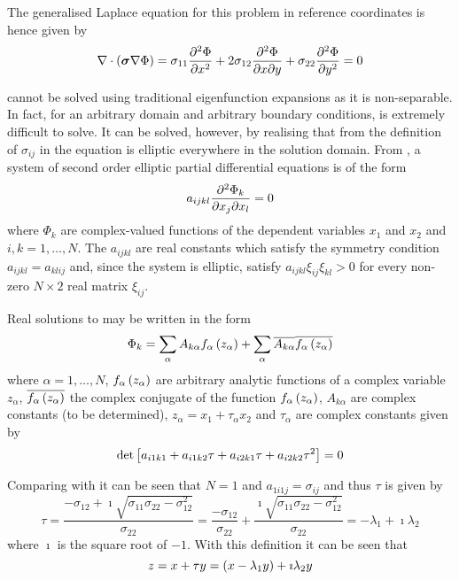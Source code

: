 The generalised Laplace equation for this problem in reference coordinates is
hence given by
\begin{equation}
  \divergence{}{\pbrac{\tensor{\sigma}\gradient{}\Phi}}=\sigma_{11}\deltwosqby{\Phi}
  {x}+2\sigma_{12}\deltwoby{\Phi}{x}{y}+\sigma_{22}\deltwosqby{\Phi}{y}
  =0
  \label{eqn:2DrcgenLaplace}
\end{equation}

 cannot be solved using traditional eigenfunction
expansions as it is non-separable. In fact, for an arbitrary domain and
arbitrary boundary conditions,  is extremely
difficult to solve. It can be solved, however, by realising that from the
definition of $\sigma_{ij}$ in  the
equation is elliptic everywhere in the solution domain. From
\citet{clements:1981}, a system of second order elliptic partial
differential equations is of the form
\begin{equation}
  a_{ijkl}\deltwoby{\Phi_{k}}{x_{j}}{x_{l}}=0
  \label{eqn:general2ndorderellipticpde}
\end{equation}
where $\Phi_{k}$ are complex-valued functions of the dependent variables
$x_{1}$ and $x_{2}$ and $i,k=1,\ldots,N$. The $a_{ijkl}$ are real constants
which satisfy the symmetry condition $a_{ijkl}=a_{klij}$ and, since the system
is elliptic, satisfy $a_{ijkl}\xi_{ij}\xi_{kl}>0$ for every non-zero $N\times
2$ real matrix $\xi_{ij}$.

Real solutions to  may be written in
the form 
\begin{equation}
  \Phi_{k}= \displaystyle\sum _{\alpha}A_{k\alpha} f_{\alpha}\left( z_{\alpha} \right) +
   \displaystyle\sum _{\alpha}\overline{A_{k\alpha}}\overline{ f_{\alpha}\left( z_{\alpha} \right) }
\end{equation}
where $\alpha=1,\hdots,N$, $ f_{\alpha}\left( z_{\alpha} \right) $ are arbitrary
analytic functions of a complex variable $z_{\alpha}$,
$\overline{ f_{\alpha}\left( z_{\alpha} \right) }$ the complex conjugate of the
function $ f_{\alpha}\left( z_{\alpha} \right) $, $A_{k\alpha}$ are complex constants
(to be determined), $z_{\alpha}=x_{1}+\tau_{\alpha} x_{2}$ and $\tau_{\alpha}$
are complex constants given by
\begin{equation}
  \det\left[ a_{i1k1}+a_{i1k2}\tau+a_{i2k1}\tau+a_{i2k2}\tau^{2} \right]=0
\end{equation}

Comparing  with
 it can be seen that $N=1$ and
$a_{1i1j}=\sigma_{ij}$ and thus $\tau$ is given by
\begin{equation}
  \tau=\dfrac{-\sigma_{12}+\imath\sqrt{\sigma_{11}\sigma_{22}-\sigma_{12}^{2}}}
  {\sigma_{22}}=\dfrac{-\sigma_{12}}{\sigma_{22}}+\dfrac{\imath\sqrt{
      \sigma_{11}\sigma_{22}-\sigma_{12}^{2}}}{\sigma_{22}}=-\lambda_{1}+
  \imath\lambda_{2}
\end{equation}
where $\imath$ is the square root of $-1$. With this definition it can be seen
that
\begin{equation}
  z=x+\tau y=\left( x-\lambda_{1}y \right)+\imath\lambda_{2}y
\end{equation}

